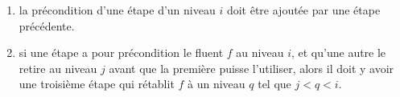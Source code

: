 {\begin{enumerate}
\item {} la précondition d'une étape d'un niveau
  $i$ doit être ajoutée par une étape précédente.

\item {} si une étape a pour précondition le fluent $f$
  au niveau $i$, et qu'une autre le retire au niveau $j$ avant que la première
  puisse l'utiliser, alors il doit y avoir une troisième étape qui rétablit $f$
  à un niveau $q$ tel que $j < q < i$.
\end{enumerate}


}